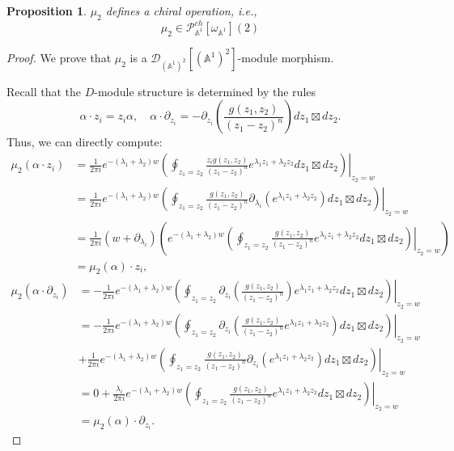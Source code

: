 \documentclass[11pt]{amsart}
\newtheorem{prop}[thm]{Proposition}
\theoremstyle{definition}
\theoremstyle{remark}
\numberwithin{equation}{section}
\renewcommand{\AA}{\mathbb{A}}
\newcommand{\cP}{\mathcal{P}}
\begin{document}
\begin{prop}
    $\mu_2$ defines a chiral operation, i.e., 
    $$    \mu_2\in \cP^{ch}_{\AA^1}[\omega_{\AA^1}](2) 
    $$
\end{prop}
\begin{proof}
  We prove that $\mu_2$ is a $\mathcal{D}_{(\mathbb{A}^{1})^{2}}[(\mathbb{A}^{1})^{2}]$-module morphism.


Recall that the $D$-module structure is determined by the rules
$$
\alpha \cdot z_{i}=z_{i}\alpha,\quad
\alpha\cdot \partial_{z_{i}}=-\partial_{z_{i}}\left(\frac{g(z_{1},z_{2})}{(z_{1}-z_{2})^{n}}\right)dz_{1}\boxtimes dz_{2} .
$$
Thus, we can directly compute:
\begin{align*}
  \mu_{2}(\alpha \cdot z_{i})&=\frac{1}{2\pi i}e^{-(\lambda_{1}+\lambda_{2})w}\left. \left(\oint_{z_{1}=z_2}\frac{z_{i}g(z_{1},z_{2})}{(z_{1}-z_{2})^{n}}e^{\lambda_{1}z_{1}+\lambda_{2}z_{2}}dz_{1}\boxtimes dz_{2}\right)\right|_{z_{2}=w}\\
&=\frac{1}{2\pi i}e^{-(\lambda_{1}+\lambda_{2})w}\left. \left(\oint_{z_{1}=z_2}\frac{g(z_{1},z_{2})}{(z_{1}-z_{2})^{n}}\partial_{\lambda_{i}}\left(e^{\lambda_{1}z_{1}+\lambda_{2}z_{2}}\right)dz_{1}\boxtimes dz_{2}\right)\right|_{z_{2}=w}\\
&=\frac{1}{2\pi i}(w+\partial_{\lambda_{i}})\left(e^{-(\lambda_{1}+\lambda_{2})w}\left. \left(\oint_{z_{1}=z_2}\frac{g(z_{1},z_{2})}{(z_{1}-z_{2})^{n}}e^{\lambda_{1}z_{1}+\lambda_{2}z_{2}}dz_{1}\boxtimes dz_{2}\right)\right|_{z_{2}=w}\right)\\
&=\mu_{2}(\alpha )\cdot z_{i},
\end{align*}
\begin{align*}
  \mu_{2}(\alpha \cdot \partial_{z_{i}})&=-\frac{1}{2\pi i}e^{-(\lambda_{1}+\lambda_{2})w}\left. \left(\oint_{z_{1}=z_2}\partial_{z_{i}}\left(\frac{g(z_{1},z_{2})}{(z_{1}-z_{2})^{n}}\right)e^{\lambda_{1}z_{1}+\lambda_{2}z_{2}}dz_{1}\boxtimes dz_{2}\right)\right|_{z_{2}=w}\\
&=-\frac{1}{2\pi i}e^{-(\lambda_{1}+\lambda_{2})w}\left. \left(\oint_{z_{1}=z_2}\partial_{z_{i}}\left(\frac{g(z_{1},z_{2})}{(z_{1}-z_{2})^{n}}e^{\lambda_{1}z_{1}+\lambda_{2}z_{2}}\right)dz_{1}\boxtimes dz_{2}\right)\right|_{z_{2}=w}\\
&+\frac{1}{2\pi i}e^{-(\lambda_{1}+\lambda_{2})w}\left. \left(\oint_{z_{1}=z_2}\frac{g(z_{1},z_{2})}{(z_{1}-z_{2})^{n}}\partial_{z_{i}}\left(e^{\lambda_{1}z_{1}+\lambda_{2}z_{2}}\right)dz_{1}\boxtimes dz_{2}\right)\right|_{z_{2}=w}\\
&=0+\frac{\lambda_{i}}{2\pi i}e^{-(\lambda_{1}+\lambda_{2})w}\left. \left(\oint_{z_{1}=z_2}\frac{g(z_{1},z_{2})}{(z_{1}-z_{2})^{n}}e^{\lambda_{1}z_{1}+\lambda_{2}z_{2}}dz_{1}\boxtimes dz_{2}\right)\right|_{z_{2}=w}\\
&=\mu_{2}(\alpha )\cdot \partial_{z_{i}}.
\end{align*}
\end{proof}
\end{document}
